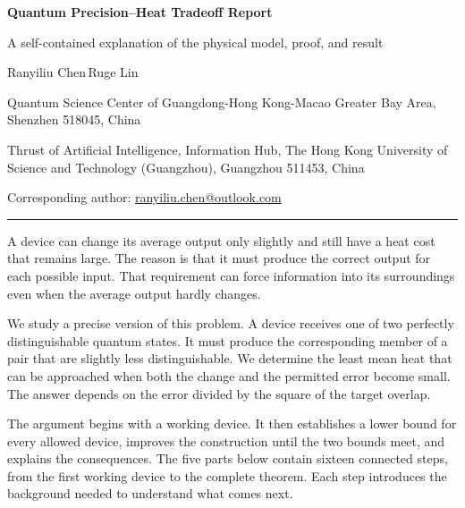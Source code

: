 \documentclass[11pt,letterpaper]{article}
\begin{document}
{\sffamily\bfseries\color{ink}\fontsize{22}{27}\selectfont Quantum Precision--Heat Tradeoff Report\par}
\vspace{3pt}
{\sffamily\small\color{graytext}A self-contained explanation of the physical model, proof, and result\par}
\vspace{7pt}
{\sffamily\small\color{ink}Ranyiliu Chen\,\qquad Ruge Lin\,\par}
{\sffamily\footnotesize\color{graytext}
Quantum Science Center of Guangdong-Hong Kong-Macao Greater Bay Area, Shenzhen 518045, China\par
Thrust of Artificial Intelligence, Information Hub, The Hong Kong University of Science and Technology (Guangzhou), Guangzhou 511453, China\par
Corresponding author: \href{mailto:ranyiliu.chen@outlook.com}{ranyiliu.chen@outlook.com}\par}
\vspace{7pt}
\noindent\color{teal}\rule{\linewidth}{0.85pt}\color{ink}
\vspace{4pt}



A device can change its average output only slightly and still have a heat cost that remains large. The reason is that it must produce the correct output for each possible input. That requirement can force information into its surroundings even when the average output hardly changes.

We study a precise version of this problem. A device receives one of two perfectly distinguishable quantum states. It must produce the corresponding member of a pair that are slightly less distinguishable. We determine the least mean heat that can be approached when both the change and the permitted error become small. The answer depends on the error divided by the square of the target overlap.

The argument begins with a working device. It then establishes a lower bound for every allowed device, improves the construction until the two bounds meet, and explains the consequences. The five parts below contain sixteen connected steps, from the first working device to the complete theorem. Each step introduces the background needed to understand what comes next.

\vspace{3pt}
\begingroup
\setlength{\parskip}{0pt}
\small
\tableofcontents
\endgroup
\clearpage
\end{document}
